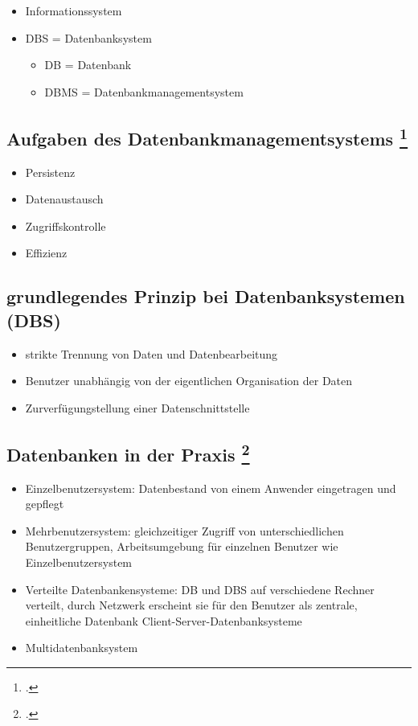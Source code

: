 \documentclass{lehramt-informatik-haupt}
\begin{document}
\begin{itemize}
\item Informationssystem
\item DBS = Datenbanksystem

\begin{itemize}
\item DB = Datenbank
\item DBMS = Datenbankmanagementsystem
\end{itemize}
\end{itemize}

%

\subsection{Aufgaben des Datenbankmanagementsystems
\footcite[Seite 13]{winter}}

\begin{itemize}
\item Persistenz
\item Datenaustausch
\item Zugriffskontrolle
\item Effizienz
\end{itemize}

%

\subsection{grundlegendes Prinzip bei Datenbanksystemen
(DBS)}

\begin{itemize}
\item strikte Trennung von Daten und Datenbearbeitung
\item Benutzer unabhängig von der eigentlichen Organisation der Daten
\item Zurverfügungstellung einer Datenschnittstelle
\end{itemize}

%

\subsection{Datenbanken in der Praxis
\footcite[Seite 13]{winter}}

\begin{itemize}
\item Einzelbenutzersystem: Datenbestand von einem Anwender eingetragen und
gepflegt

\item Mehrbenutzersystem: gleichzeitiger Zugriff von unterschiedlichen
Benutzergruppen, Arbeitsumgebung für einzelnen Benutzer wie
Einzelbenutzersystem

\item Verteilte Datenbankensysteme: DB und DBS auf verschiedene Rechner
verteilt, durch Netzwerk erscheint sie für den Benutzer als zentrale,
einheitliche Datenbank \zB Client-Server-Datenbanksysteme

\item Multidatenbanksystem
\end{itemize}

\literatur
\end{document}
